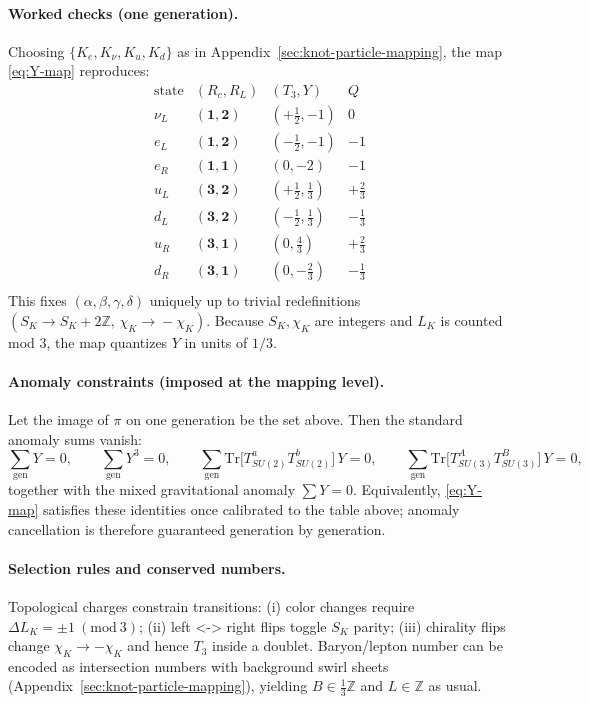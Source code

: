     \paragraph{Worked checks (one generation).}
    Choosing \(\{K_e,K_\nu,K_u,K_d\}\) as in Appendix~\ref{sec:knot-particle-mapping}, the map \eqref{eq:Y-map} reproduces:
    \[
        \begin{array}{c|c|c|c}
            \text{state} & (R_c,R_L) & (T_3,Y) & Q \\
            \hline
            \nu_L & (\mathbf{1},\mathbf{2}) & (+\tfrac{1}{2},-1) & 0 \\
            e_L  & (\mathbf{1},\mathbf{2}) & (-\tfrac{1}{2},-1) & -1 \\
            e_R  & (\mathbf{1},\mathbf{1}) & (0,-2) & -1 \\
            u_L  & (\mathbf{3},\mathbf{2}) & (+\tfrac{1}{2},\tfrac{1}{3}) & +\tfrac{2}{3} \\
            d_L  & (\mathbf{3},\mathbf{2}) & (-\tfrac{1}{2},\tfrac{1}{3}) & -\tfrac{1}{3} \\
            u_R  & (\mathbf{3},\mathbf{1}) & (0,\tfrac{4}{3}) & +\tfrac{2}{3} \\
            d_R  & (\mathbf{3},\mathbf{1}) & (0,-\tfrac{2}{3}) & -\tfrac{1}{3} \\
        \end{array}
    \]
    This fixes \((\alpha,\beta,\gamma,\delta)\) uniquely up to trivial redefinitions \((S_K\!\to\!S_K+2\mathbb{Z},\,\chi_K\!\to\!-\chi_K)\).
    Because \(S_K,\chi_K\) are integers and \(L_K\) is counted mod \(3\), the map quantizes \(Y\) in units of \(1/3\).

    \paragraph{Anomaly constraints (imposed at the mapping level).}
    Let the image of \(\pi\) on one generation be the set above.
    Then the standard anomaly sums vanish:
    \[
        \sum_{\text{gen}} Y = 0,\qquad
        \sum_{\text{gen}} Y^3 = 0,\qquad
        \sum_{\text{gen}} \mathrm{Tr}\big[T^a_{SU(2)}T^b_{SU(2)}\big]\,Y=0,\qquad
        \sum_{\text{gen}} \mathrm{Tr}\big[T^A_{SU(3)}T^B_{SU(3)}\big]\,Y=0,
    \]
    together with the mixed gravitational anomaly \(\sum Y=0\).
    Equivalently, \eqref{eq:Y-map} satisfies these identities once calibrated to the table above; anomaly cancellation is therefore guaranteed generation by generation.

    \paragraph{Selection rules and conserved numbers.}
    Topological charges constrain transitions:
    (i) color changes require \(\Delta L_K=\pm1\ (\mathrm{mod}\ 3)\);
    (ii) left <-> right flips toggle \(S_K\) parity;
    (iii) chirality flips change \(\chi_K\to-\chi_K\) and hence \(T_3\) inside a doublet.
    Baryon/lepton number can be encoded as intersection numbers with background swirl sheets (Appendix~\ref{sec:knot-particle-mapping}), yielding \(B\in\tfrac{1}{3}\mathbb{Z}\) and \(L\in\mathbb{Z}\) as usual.

